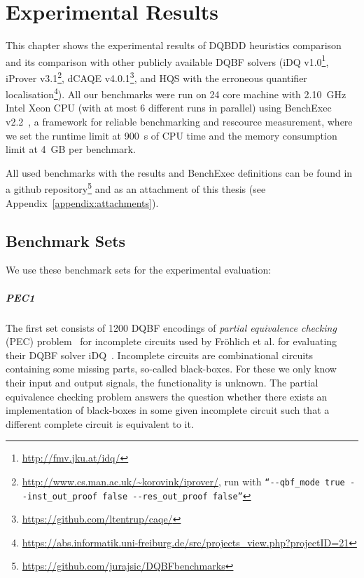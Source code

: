 \documentclass[
  digital, %
  color,
  twoside, %
  table,   %
  nolof,     %
  nolot,     %
]{fithesis3}
\theoremstyle{definition}
\theoremstyle{remark}
\begin{document}
\chapter{Experimental Results}
\label{chap:experiments}
This chapter shows the experimental results of DQBDD heuristics comparison and its comparison with other publicly available DQBF solvers 
(iDQ v1.0\footnote{\url{http://fmv.jku.at/idq/}},
iProver v3.1\footnote{\url{http://www.cs.man.ac.uk/~korovink/iprover/}, run with \texttt{``-{}-qbf\_mode true -{}-inst\_out\_proof false -{}-res\_out\_proof false''}},
dCAQE v4.0.1\footnote{\url{https://github.com/ltentrup/caqe/}},
and HQS with the erroneous quantifier localisation\footnote{\url{https://abs.informatik.uni-freiburg.de/src/projects_view.php?projectID=21}}). All our benchmarks were run on 24 core machine with \SI{2.10}{GHz} Intel Xeon CPU (with at most 6 different runs in parallel) using BenchExec v2.2~\cite{benchexec}, a framework for reliable benchmarking and rescource measurement, where we set the runtime limit at \SI{900}{s} of CPU time and the memory consumption limit at \SI{4}{GB} per benchmark.

All used benchmarks with the results and BenchExec definitions can be found in a github repository\footnote{\url{https://github.com/jurajsic/DQBFbenchmarks}} and as an attachment of this thesis (see Appendix~\ref{appendix:attachments}).

\section{Benchmark Sets}
We use these benchmark sets for the experimental evaluation:


\paragraph{PEC1}
The first set consists of 1200 DQBF encodings of \emph{partial equivalence checking} (PEC) problem~\cite{PECScholl} for incomplete circuits used by Fr\"{o}hlich et al. for evaluating their DQBF solver iDQ~\cite{iDQandDQDIMACS}. Incomplete circuits are combinational circuits containing some missing parts, so-called black-boxes. For these we only know their input and output signals, the functionality is unknown. The partial equivalence checking problem answers the question whether there exists an implementation of black-boxes in some given incomplete circuit such that a different complete circuit is equivalent to it.
\end{document}
